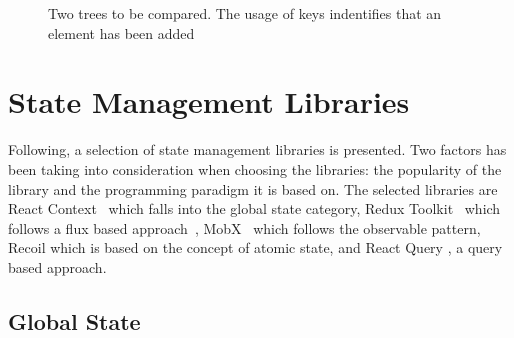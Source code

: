 \begin{figure}
\begin{Shaded}
\begin{Highlighting}[]
   \OperatorTok{=}\KeywordTok{\textgreater{}}
   \OperatorTok{=}\KeywordTok{\textgreater{}}

   \OperatorTok{=}\KeywordTok{\textgreater{}}
   \OperatorTok{=}\KeywordTok{\textgreater{}}
   \OperatorTok{=}\KeywordTok{\textgreater{}}
\end{Highlighting}
\end{Shaded}
\caption{Two trees to be compared. The usage of keys indentifies that an element has been added}
\label{code_reconciliation_usage_of_keys}
\end{figure}

\clearpage
\hypertarget{state-management-libraries}{%
\section{State Management
Libraries}\label{state-management-libraries}}

Following, a selection of state management libraries is presented. Two
factors has been taking into consideration when choosing the libraries:
the popularity of the library and the programming paradigm it is based
on. The selected libraries are React Context~\cite{react_context} which falls into
the global state category, Redux Toolkit~\cite{redux_toolkit} which follows a flux
based approach~\cite{flux}, MobX~\cite{mobx} which follows the observable pattern, Recoil
\cite{recoil} which is based on the concept of atomic state, and React Query
\cite{react_query}, a query based approach.

\hypertarget{global-state}{%
\subsection{Global State}\label{global-state}}

